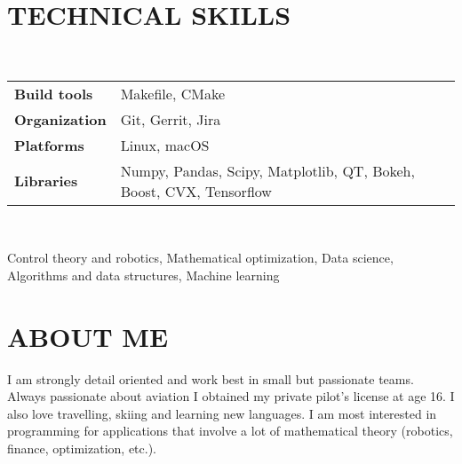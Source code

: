 \documentclass{ResumeTemplate}
\begin{document}
\begin{minipage}[c][0.99\textheight]{0.34\linewidth}
        \begin{minipage}[c]{0.8\linewidth}
        \end{minipage}

        \section{TECHNICAL SKILLS}


        ~

        \noindent\begin{tabularx}{\linewidth}{>{\bfseries}lX}
           Build tools     & Makefile, CMake \\
           Organization    & Git, Gerrit, Jira \\
           Platforms       & Linux, macOS \\
           Libraries       & Numpy, Pandas, Scipy, Matplotlib, QT, Bokeh, Boost, CVX, Tensorflow
        \end{tabularx}

        ~

        Control theory and robotics, Mathematical optimization, Data science, Algorithms and data structures, Machine learning
        
        \section{ABOUT ME}

        \raggedright
        I am strongly detail oriented and work best in small but passionate teams.
        \newline\newline
        Always passionate about aviation I obtained my private pilot's license at age 16. I also love travelling, skiing and learning new languages. 
        \newline\newline
        I am most interested in programming for applications that involve a lot of mathematical theory (robotics, finance, optimization, etc.).

    \end{minipage}%
\end{document}
